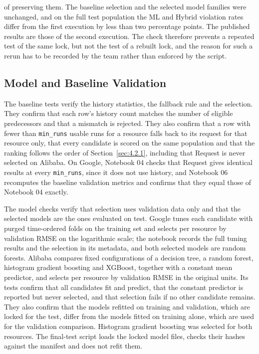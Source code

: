 \documentclass{IEEEtran}
\begin{document}
of preserving them. The baseline selection and the selected model families were unchanged, and on the full test population the ML and Hybrid violation rates differ from the first execution by less than two percentage points. The published results are those of the second execution. The check therefore prevents a repeated test of the same lock, but not the test of a rebuilt lock, and the reason for such a rerun has to be recorded by the team rather than enforced by the script.

\subsection{Model and Baseline Validation}\label{sec:6.3}

The baseline tests verify the history statistics, the fallback rule and the selection. They confirm that each row's history count matches the number of eligible predecessors and that a mismatch is rejected. They also confirm that a row with fewer than \texttt{min\_runs} usable runs for a resource falls back to its request for that resource only, that every candidate is scored on the same population and that the ranking follows the order of Section~\ref{sec:4.2.1}, including that Request is never selected on Alibaba. On Google, Notebook 04 checks that Request gives identical results at every \texttt{min\_runs}, since it does not use history, and Notebook 06 recomputes the baseline validation metrics and confirms that they equal those of Notebook 04 exactly.

The model checks verify that selection uses validation data only and that the selected models are the ones evaluated on test. Google tunes each candidate with purged time-ordered folds on the training set and selects per resource by validation RMSE on the logarithmic scale; the notebook records the full tuning results and the selection in its metadata, and both selected models are random forests. Alibaba compares fixed configurations of a decision tree, a random forest, histogram gradient boosting and XGBoost, together with a constant mean predictor, and selects per resource by validation RMSE in the original units. Its tests confirm that all candidates fit and predict, that the constant predictor is reported but never selected, and that selection fails if no other candidate remains. They also confirm that the models refitted on training and validation, which are locked for the test, differ from the models fitted on training alone, which are used for the validation comparison. Histogram gradient boosting was selected for both resources. The final-test script loads the locked model files, checks their hashes against the manifest and does not refit them.
\end{document}

